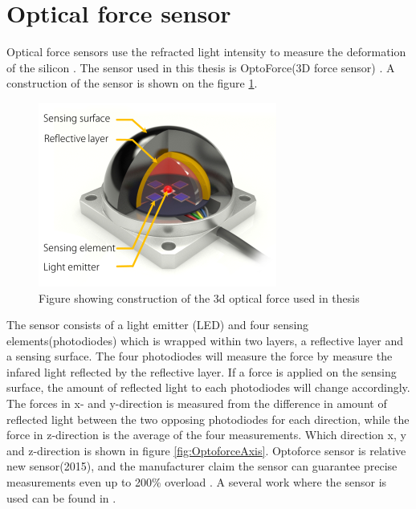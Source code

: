 \documentclass[USenglish]{ifimaster}  %
\begin{document}
\section{Optical force sensor}
Optical force sensors use the refracted light intensity to measure the deformation of the silicon \cite{6027100}\cite{6907805}. The sensor used in this thesis is OptoForce(3D force sensor) \cite{Optoforce}. A construction of the sensor is shown on the figure \ref{fig:OptoforceBuild}. 
\begin{figure}[h]
	\centering
	\includegraphics[scale=0.8]{Figures/OptoforceBuild}
	\caption{Figure showing construction of the 3d optical force used in thesis \cite{OptoforceFig}}
	\label{fig:OptoforceBuild}
\end{figure}
\FloatBarrier

The sensor consists of a light emitter (LED) and four sensing elements(photodiodes) which is wrapped within two layers, a reflective layer and a sensing surface. The four photodiodes will measure the force by measure the infared light reflected by the reflective layer. If a force is applied on the sensing surface, the amount of reflected light to each photodiodes will change accordingly. The forces in x- and y-direction is measured from the difference in amount of reflected light between the two opposing photodiodes for each direction, while the force in z-direction is the average of the four measurements. Which direction x, y and z-direction is shown in figure \ref{fig:OptoforceAxis}. Optoforce sensor is relative new sensor(2015), and the manufacturer claim the sensor can guarantee precise measurements even up to 200\% overload \cite{Optoforce2}. A several work where the sensor is used can be found in \cite{7803326,7759112,7849467}.
\end{document}
